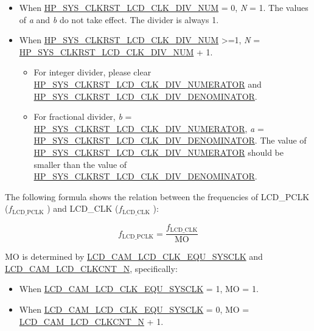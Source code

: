 \documentclass[main\_\_EN.tex]{subfiles}
\begin{document}
\begin{itemize}
    \item When \hyperref[fielddesc:HPSYSCLKRSTLCDCLKDIVNUM]{HP\_SYS\_CLKRST\_LCD\_CLK\_DIV\_NUM} = 0, \textit{N} = 1. The values of \textit{a} and \textit{b} do not take effect. The divider is always 1.
    \item When \hyperref[fielddesc:HPSYSCLKRSTLCDCLKDIVNUM]{HP\_SYS\_CLKRST\_LCD\_CLK\_DIV\_NUM} >=1, \textit{N} = \hyperref[fielddesc:HPSYSCLKRSTLCDCLKDIVNUM]{HP\_SYS\_CLKRST\_LCD\_CLK\_DIV\_NUM} + 1.
    \begin{itemize}
        \item For integer divider, please clear \hyperref[fielddesc:HPSYSCLKRSTLCDCLKDIVNUMERATOR]{HP\_SYS\_CLKRST\_LCD\_CLK\_DIV\_NUMERATOR} and \hyperref[fielddesc:HPSYSCLKRSTLCDCLKDIVDENOMINATOR]{HP\_SYS\_CLKRST\_LCD\_CLK\_DIV\_DENOMINATOR}.
        \item For fractional divider, \textit{b} = \hyperref[fielddesc:HPSYSCLKRSTLCDCLKDIVNUMERATOR]{HP\_SYS\_CLKRST\_LCD\_CLK\_DIV\_NUMERATOR}, \textit{a} = \hyperref[fielddesc:HPSYSCLKRSTLCDCLKDIVDENOMINATOR]{HP\_SYS\_CLKRST\_LCD\_CLK\_DIV\_DENOMINATOR}. The value of \hyperref[fielddesc:HPSYSCLKRSTLCDCLKDIVNUMERATOR]{HP\_SYS\_CLKRST\_LCD\_CLK\_DIV\_NUMERATOR} should be smaller than the value of  \hyperref[fielddesc:HPSYSCLKRSTLCDCLKDIVDENOMINATOR]{HP\_SYS\_CLKRST\_LCD\_CLK\_DIV\_DENOMINATOR}.
    \end{itemize}
\end{itemize}

The following formula shows the relation between the frequencies of LCD\_PCLK ($f_{\textrm{LCD\_PCLK}}$ ) and LCD\_CLK ($f_{\textrm{LCD\_CLK}}$ ):

$$f_{\textrm{LCD\_PCLK}} = \frac{f_{\textrm{LCD\_CLK}}}{\textrm{MO}}$$


MO is determined by  \hyperref[fielddesc:LCDCAMLCDCLKEQUSYSCLK]{LCD\_CAM\_LCD\_CLK\_EQU\_SYSCLK} and  \hyperref[fielddesc:LCDCAMLCDCLKCNTN]{LCD\_CAM\_LCD\_CLKCNT\_N}, specifically:

\begin{itemize}
    \item When  \hyperref[fielddesc:LCDCAMLCDCLKEQUSYSCLK]{LCD\_CAM\_LCD\_CLK\_EQU\_SYSCLK} = 1, MO = 1.
    \item When  \hyperref[fielddesc:LCDCAMLCDCLKEQUSYSCLK]{LCD\_CAM\_LCD\_CLK\_EQU\_SYSCLK} = 0, MO = \hyperref[fielddesc:LCDCAMLCDCLKCNTN]{LCD\_CAM\_LCD\_CLKCNT\_N} + 1.
\end{itemize}
\end{document}
